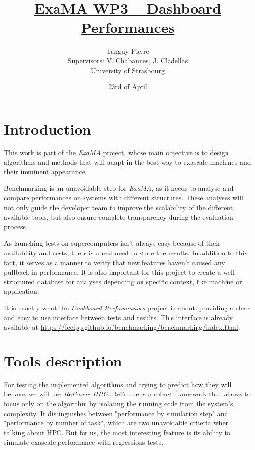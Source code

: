 \documentclass[12pt]{article}
\title{\underline{\textbf{ExaMA WP3 -- Dashboard Performances}}}
\author{Tanguy Pierre\\
            [1cm]
            Supervisors: V. Chabannes, J. Cladellas\\
            [2cm]
            University of Strasbourg}
\date{23rd of April}
\begin{document}
    \maketitle      %


\newpage
\section{Introduction}

This work is part of the \textit{ExaMA} project, whose main objective is to design algorithms and methods
that will adapt in the best way to exascale machines and their imminent appearance.

Benchmarking is an unavoidable step for \textit{ExaMA}, as it needs to analyse and compare performances on systems
with different structures. These analyses will not only guide the developer team to improve the scalability of the different available tools,
but also ensure complete transparency during the evaluation process.

As launching tests on supercomputers isn't always easy because of their availability and costs, there is a real need to store the results.
In addition to this fact, it serves as a manner to verify that new features haven't caused any pullback in performance.
It is also important for this project to create a well-structured database for analyses depending on specific context, like machine or application.

It is exactly what the \textit{Dashboard Performances} project is about: providing a clear and easy to use interface between tests and results.
This interface is already available at \url{https://feelpp.github.io/benchmarking/benchmarking/index.html}.


\section{Tools description}

For testing the implemented algorithms and trying to predict how they will behave, we will use \textit{ReFrame HPC}\cite*{ReFrame}.
ReFrame is a robust framework that allows to focus only on the algorithm by isolating the running code from the system's complexity.
It distinguishes between "performance by simulation step" and "performance by number of task", which are two unavoidable criteria when talking about HPC.
But for us, the most interesting feature is its ability to simulate exascale performance with regressions tests.
\end{document}
